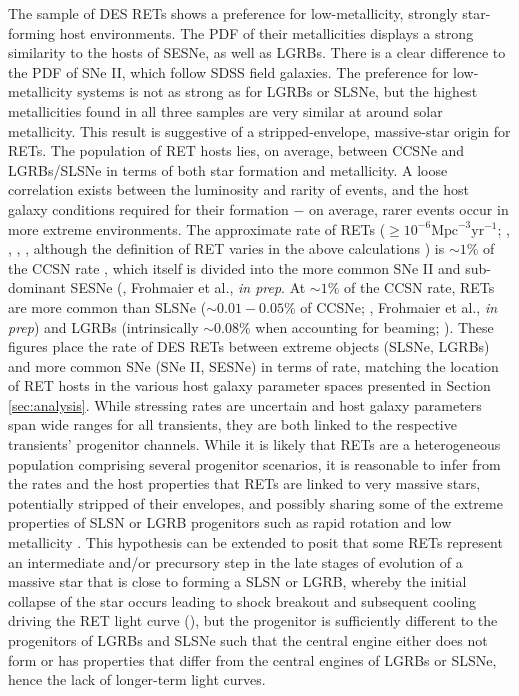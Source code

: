 \documentclass[fleqn,usenatbib,]{mnras}
\newcommand{\replyref}[1]{\color{magenta}#1 \color{black}}
\begin{document}
The sample of DES RETs shows a preference for low-metallicity, strongly star-forming host environments. The PDF of their metallicities displays a strong similarity to the hosts of SESNe, as well as LGRBs. There is a clear difference to the PDF of SNe II, which follow SDSS field galaxies. The preference for low-metallicity systems is not as strong as for LGRBs or SLSNe, but the highest metallicities found in all three samples are very similar at around solar metallicity. This result is suggestive of a stripped-envelope, massive-star origin for RETs. 
The population of RET hosts lies, on average, between CCSNe and LGRBs/SLSNe in terms of both star formation and metallicity. A loose correlation exists between the luminosity and rarity of events, and the host galaxy conditions required for their formation $-$ on average, rarer events occur in more extreme environments. The approximate rate of RETs ($\geq 10^{-6} \mathrm{Mpc}^{-3} \mathrm{yr}^{-1}$; \citealt{Drout2014}, , \citealt{Coppejans2020}, \citealt{Ho2020}, \citealt{Tampo2020} \replyref{although the definition of RET varies in the above calculations}) is $\sim1\%$ of the CCSN rate \citep{Li2011,Horiuchi2011,Strolger2015}, which itself is divided into the more common SNe II and sub-dominant SESNe (\citealt{Kelly2012}, Frohmaier et al., \textit{in prep}. At $\sim1\%$ of the CCSN rate, RETs are more common than SLSNe ($\sim0.01 - 0.05\%$ of CCSNe; \citealt{McCrum2015,Prajs2017}, Frohmaier et al., \textit{in prep}) and LGRBs (intrinsically $\sim0.08\%$ when accounting for beaming; \citealt{Graham2016}). These figures place the rate of DES RETs between extreme objects (SLSNe, LGRBs) and more common SNe (SNe II, SESNe) in terms of rate, matching the location of RET hosts in the various host galaxy parameter spaces presented in Section \ref{sec:analysis}. While stressing rates are uncertain and host galaxy parameters span wide ranges for all transients, they are both linked to the respective transients' progenitor channels. \replyref{While it is likely that RETs are a heterogeneous population comprising several progenitor scenarios, it is reasonable to infer from the rates and the host properties} that RETs are linked to very massive stars, potentially stripped of their envelopes, and possibly sharing some of the extreme properties of SLSN or LGRB \replyref{progenitors such as rapid rotation and low metallicity}. This hypothesis \replyref{can be extended to posit} that \replyref{some} RETs \replyref{represent} an intermediate and/or precursory step \replyref{in the late stages of evolution of a massive star that is close to forming a SLSN or LGRB, whereby the initial collapse of the star occurs leading to shock breakout and subsequent cooling driving the RET light curve (\citetalias{Pursiainen2018}), but the progenitor is sufficiently different to the progenitors of LGRBs and SLSNe such that the central engine either does not form or has properties that differ from the central engines of LGRBs or SLSNe, hence the lack of longer-term light curves. }
\end{document}
